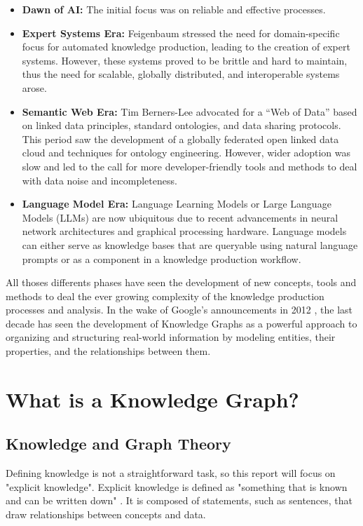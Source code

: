 \documentclass[11pt]{article} %
\begin{document}
\begin{itemize}
    \item \textbf{Dawn of AI:} The initial focus was on reliable and effective processes.
    \item \textbf{Expert Systems Era:} Feigenbaum stressed the need for domain-specific focus for automated knowledge production, leading to the creation of expert systems. However, these systems proved to be brittle and hard to maintain, thus the need for scalable, globally distributed, and interoperable systems arose.
    \item \textbf{Semantic Web Era:} Tim Berners-Lee advocated for a “Web of Data” based on linked data principles, standard ontologies, and data sharing protocols. This period saw the development of a globally federated open linked data cloud and techniques for ontology engineering. However, wider adoption was slow and led to the call for more developer-friendly tools and methods to deal with data noise and incompleteness.
    \item \textbf{Language Model Era:} Language Learning Models or Large Language Models (LLMs) are now ubiquitous due to recent advancements in neural network architectures and graphical processing hardware. Language models can either serve as knowledge bases that are queryable using natural language prompts or as a component in a knowledge production workflow.
\end{itemize}

All thoses differents phases have seen the development of new concepts, tools and methods to deal the ever growing complexity of the knowledge production processes and analysis. In the wake of Google's announcements in 2012 \cite*{googleblog2023knowledgegraph}, the last decade has seen the development of Knowledge Graphs as a powerful approach to organizing and structuring real-world information by modeling entities, their properties, and the relationships between them. 

\section{What is a Knowledge Graph?}

\subsection{Knowledge and Graph Theory}
Defining knowledge is not a straightforward task, so this report will focus on "explicit knowledge". Explicit knowledge is defined as "something that is known and can be written down" \cite[p.4]{KG21}. It is composed of statements, such as sentences, that draw relationships between concepts and data.
\end{document}
